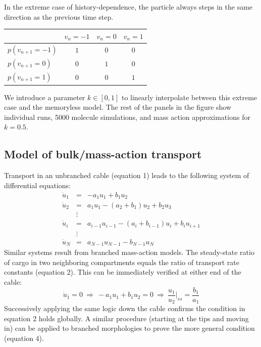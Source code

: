 \documentclass[11pt]{wlpeerj}
\begin{document}
In the extreme case of history-dependence, the particle always steps in the same direction as the previous time step.
\begin{center}
  \begin{tabular}{ l | c  c  c }
    & $v_n=-1$ & $v_n=0$ & $v_n=1$ \\
    \hline
    $p(v_{n+1} = -1)$ & $1$ & $0$ & $0$ \\ 
    $p(v_{n+1} = 0)$  & $0$ & $1$ & $0$ \\ 
    $p(v_{n+1} = 1)$  & $0$ & $0$ & $1$ \\
    \hline
  \end{tabular}
\end{center}
We introduce a parameter $k \in [0,1]$ to linearly interpolate between this extreme case and the memoryless model. The rest of the panels in the figure show individual runs, 5000 molecule simulations, and mass action approximations for $k=0.5$.

\subsection*{Model of bulk/mass-action transport}
Transport in an unbranched cable (equation 1) leads to the following system of differential equations:
$$
\begin{array}{lcl}
\dot{u}_1 & = & -a_1 u_1 + b_1 u_2 \\
\dot{u}_2 & = & a_1 u_1 - (a_2+b_1) u_2 + b_2 u_3 \\
~ & \vdots & ~ \\
\dot{u}_i & = & a_{i-1} u_{i-1} - (a_i+b_{i-1}) u_i + b_i u_{i+1} \\
~ & \vdots & ~ \\
\dot{u}_N & = & a_{N-1} u_{N-1} - b_{N-1} u_N 
\end{array}
$$
Similar systems result from branched mass-action models. The steady-state ratio of cargo in two neighboring compartments equals the ratio of transport rate constants (equation 2). This can be immediately verified at either end of the cable:
$$
\dot{u}_1 = 0 ~\Rightarrow~ -a_{1} u_{1} + b_{1} u_2 = 0 ~\Rightarrow~ \frac{u_1}{u_2} \Bigg |_{ss} = \frac{b_1}{a_1}
$$
Successively applying the same logic down the cable confirms the condition in equation 2 holds globally. A similar procedure (starting at the tips and moving in) can be applied to branched morphologies to prove the more general condition (equation 4).

\end{document}
